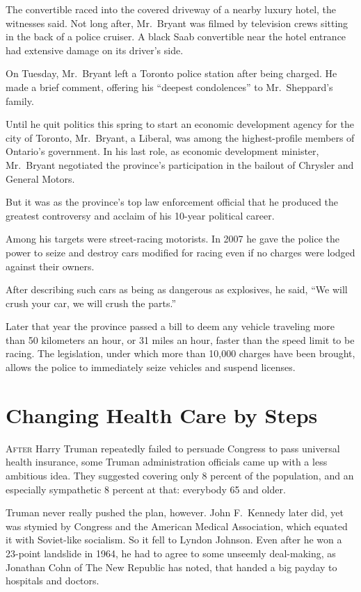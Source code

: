 ﻿\documentclass[12pt]{article}
\begin{document}
The convertible\cite{convertible} raced into the covered driveway of a nearby luxury hotel, the
witnesses said. Not long after, Mr.~Bryant was filmed by television crews sitting in the back of a
police cruiser. A black Saab convertible near the hotel entrance had extensive damage on its
driver's side.

On Tuesday, Mr.~Bryant left a Toronto police station after being charged. He made a brief comment,
offering his ``deepest condolences'' to Mr.~Sheppard's family.

Until he quit politics this spring to start an economic development agency for the city of Toronto,
Mr.~Bryant, a Liberal, was among the highest-profile members of Ontario's government. In his last
role, as economic development minister, Mr.~Bryant negotiated the province's participation in the
bailout of Chrysler and General Motors.

But it was as the province's top law enforcement official that he produced the greatest controversy
and acclaim\cite{acclaim} of his 10-year political career.

Among his targets were street-racing motorists. In 2007 he gave the police the power to seize and
destroy cars modified for racing even if no charges were lodged against their owners.

After describing such cars as being as dangerous as explosives, he said, ``We will crush your car,
we will crush the parts.''

Later that year the province passed a bill to deem any vehicle traveling more than 50 kilometers an
hour, or 31 miles an hour, faster than the speed limit to be racing. The legislation, under which
more than 10,000 charges have been brought, allows the police to immediately seize vehicles and
suspend licenses.

\section{Changing Health Care by Steps}

\lettrine{A}{fter} Harry Truman repeatedly failed to persuade Congress to pass universal health
insurance, some Truman administration officials came up with a less ambitious idea. They suggested
covering only 8 percent of the population, and an especially sympathetic 8 percent at that:
everybody 65 and older.

Truman never really pushed the plan, however. John F.~Kennedy later did, yet was
stymied\cite{stymie} by Congress and the American Medical Association, which equated it with
Soviet-like socialism. So it fell to Lyndon Johnson. Even after he won a 23-point landslide in 1964,
he had to agree to some unseemly deal-making, as Jonathan Cohn of The New Republic has noted, that
handed a big payday to hospitals and doctors.
\end{document}

